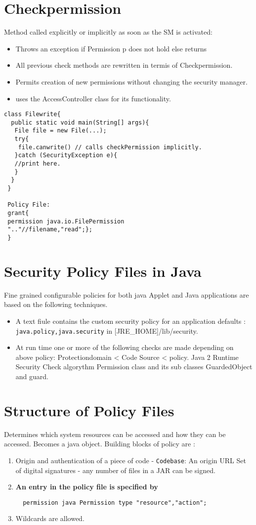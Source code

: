 \documentclass[a4paper,10pt]{scrreprt}
\begin{document}
\section{Checkpermission}
Method called explicitly or implicitly as soon as the SM is activated:
\begin{itemize}
 \item Throws an exception if Permission p does not hold else returns
 \item All previous check methods are rewritten in termis of Checkpermission.
 \item Permits creation of new permissions without changing the security manager.
 \item uses the AccessController class for its functionality.
\end{itemize}
\begin{lstlisting}[caption=sample File Write Check]
 class Filewrite{
  public static void main(String[] args){
   File file = new File(...);
   try{
    file.canwrite() // calls checkPermission implicitly.
   }catch (SecurityException e){
   //print here.
   }
  }
 }
 
 Policy File:
 grant{
 permission java.io.FilePermission
 ".."//filename,"read";};
 }
\end{lstlisting}

\section{Security Policy Files in Java}
Fine grained configurable policies for both java Applet and Java applications are based on the following techniques. 
\begin{itemize}
 \item A text fiule contains the custom security policy for an application defaults : 
\texttt{java.policy,java.security} in [JRE\_HOME]/lib/security.
\item At run time one or more of the following checks are made depending on above policy:
\subitem Protectiondomain < Code Source < policy.
\subitem Java 2 Runtime Security Check algorythm 
\subitem Permission class and its sub classes
\subitem GuardedObject and guard.
\end{itemize}

\section{Structure of Policy Files}
Determines which system resources can be accessed and how they can be accessed. Becomes a java object. 
Building blocks of policy are :
\begin{enumerate}
 \item Origin and authentication of a piece of code - \texttt{Codebase}:
  \subitem An origin URL
  \subitem Set of digital signatures - any number of files in a JAR can be signed.
  \item \textbf{An entry in the policy file is specified by} \\
  \begin{verbatim}
  permission java Permission type "resource","action";
 \end{verbatim}
\item Wildcards are allowed. 
\end{enumerate}
\end{document}
